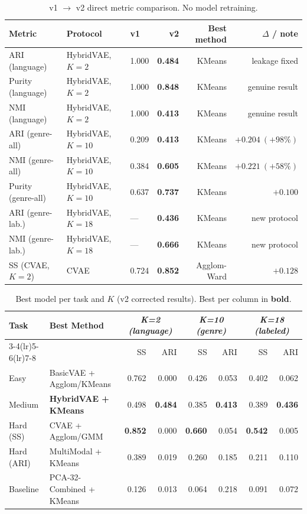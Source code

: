 \documentclass{article}
\begin{document}
\begin{table}[H]
\centering
\caption{v1 $\to$ v2 direct metric comparison. No model retraining.}
\label{tab:v1v2}
\small
\begin{tabular}{lllrrr}
\toprule
\textbf{Metric} & \textbf{Protocol} & \textbf{v1} & \textbf{v2} &
\textbf{Best method} & \textbf{$\Delta$ / note} \\
\midrule
ARI (language)    & HybridVAE, $K\!=\!2$  & 1.000 & \textbf{0.484} & KMeans & leakage fixed \\
Purity (language) & HybridVAE, $K\!=\!2$  & 1.000 & \textbf{0.848} & KMeans & genuine result \\
NMI (language)    & HybridVAE, $K\!=\!2$  & 1.000 & \textbf{0.413} & KMeans & genuine result \\
ARI (genre-all)   & HybridVAE, $K\!=\!10$ & 0.209 & \textbf{0.413} & KMeans & \boldmath$+0.204~(+98\%)$ \\
NMI (genre-all)   & HybridVAE, $K\!=\!10$ & 0.384 & \textbf{0.605} & KMeans & \boldmath$+0.221~(+58\%)$ \\
Purity (genre-all)& HybridVAE, $K\!=\!10$ & 0.637 & \textbf{0.737} & KMeans & $+0.100$ \\
ARI (genre-lab.)  & HybridVAE, $K\!=\!18$ & ---   & \textbf{0.436} & KMeans & new protocol \\
NMI (genre-lab.)  & HybridVAE, $K\!=\!18$ & ---   & \textbf{0.666} & KMeans & new protocol \\
SS (CVAE, $K\!=\!2$) & CVAE            & 0.724 & \textbf{0.852} & Agglom-Ward & $+0.128$ \\
\bottomrule
\end{tabular}
\end{table}

\begin{table}[H]
\centering
\caption{Best model per task and $K$ (v2 corrected results). Best per column in \textbf{bold}.}
\label{tab:summary}
\small
\begin{tabular}{llrrrrrr}
\toprule
\textbf{Task} & \textbf{Best Method} &
\multicolumn{2}{c}{\textit{K=2 (language)}} &
\multicolumn{2}{c}{\textit{K=10 (genre)}} &
\multicolumn{2}{c}{\textit{K=18 (labeled)}} \\
\cmidrule(lr){3-4}\cmidrule(lr){5-6}\cmidrule(lr){7-8}
 & & SS & ARI & SS & ARI & SS & ARI \\
\midrule
Easy      & BasicVAE + Agglom/KMeans & 0.762 & 0.000 & 0.426 & 0.053 & 0.402 & 0.062 \\
Medium    & \textbf{HybridVAE + KMeans} & 0.498 & \textbf{0.484} & 0.385 & \textbf{0.413} & 0.389 & \textbf{0.436} \\
Hard (SS) & CVAE + Agglom/GMM        & \textbf{0.852} & 0.000 & \textbf{0.660} & 0.054 & \textbf{0.542} & 0.005 \\
Hard (ARI)& MultiModal + KMeans      & 0.389 & 0.019 & 0.260 & 0.185 & 0.211 & 0.110 \\
\midrule
\rowcolor{gray!15} Baseline & PCA-32-Combined + KMeans & 0.126 & 0.013 & 0.064 & 0.218 & 0.091 & 0.072 \\
\bottomrule
\end{tabular}
\end{table}
\end{document}
